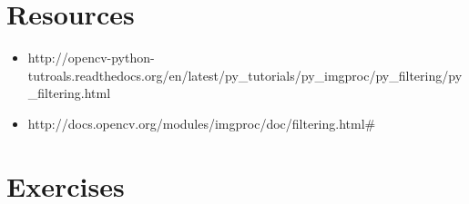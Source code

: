 \documentclass[]{article}
\providecommand{\tightlist}{%
  \setlength{\itemsep}{0pt}\setlength{\parskip}{0pt}}
\begin{document}
\newpage
\section{Resources}\label{resources}

\begin{itemize}
\tightlist
\item
  http://opencv-python-tutroals.readthedocs.org/en/latest/py\_tutorials/py\_imgproc/py\_filtering/py\_filtering.html
\item
  http://docs.opencv.org/modules/imgproc/doc/filtering.html\#
\end{itemize}

\section{Exercises}\label{exercises}
\end{document}
